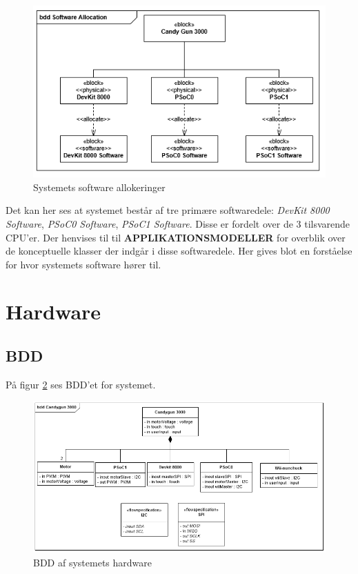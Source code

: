 \begin{figure}[H]
	\centering
	\includegraphics[width=\textwidth]{SystemArkitektur/images/SoftwareAllocation.PNG}
	\caption{Systemets software allokeringer}
	\label{figure:allocationDiagram}
\end{figure}

Det kan her ses at systemet består af tre primære softwaredele: \textit{DevKit 8000 Software}, \textit{PSoC0 Software}, \textit{PSoC1 Software}. Disse er fordelt over de 3 tilsvarende CPU'er. Der henvises til til \textbf{APPLIKATIONSMODELLER} for overblik over de konceptuelle klasser der indgår i disse softwaredele. Her gives blot en forståelse for hvor systemets software hører til.

\section{Hardware}

\subsection{BDD}

På figur \ref{figure:bddDiagram} ses BDD'et for systemet.

\begin{figure}[H]
	\centering
	\includegraphics[width=\textwidth]{SystemArkitektur/images/BDD_overordnet.PNG}
	\caption{BDD af systemets hardware}
	\label{figure:bddDiagram}
\end{figure}

